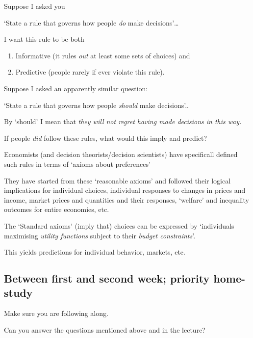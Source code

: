\documentclass[]{article}
\begin{document}
\bigskip

Suppose I asked you

`State a rule that governs how people \emph{do} make decisions'\ldots{}

I want this rule to be both

\begin{enumerate}
\def\labelenumi{\arabic{enumi}.}
\item
  Informative (it rules \emph{out} at least some sets of choices) and
\item
  Predictive (people rarely if ever violate this rule).
\end{enumerate}

\bigskip

Suppose I asked an apparently similar question:

`State a rule that governs how people \emph{should} make decisions'..

By `should' I mean that \emph{they will not regret having made decisions in this way.}

\bigskip

If people \emph{did} follow these rules, what would this imply and predict?

Economists (and decision theorists/decision scientists) have specificall defined such rules in terms of `axioms about preferences'

They have started from these `reasonable axioms' and followed their logical implications for individual choices, individual responses to changes in prices and income, market prices and quantities and their responses, `welfare' and inequality outcomes for entire economies, etc.

The `Standard axioms' (imply that) choices can be expressed by `individuals maximising \emph{utility functions} subject to their \emph{budget constraints}'.

This yields predictions for individual behavior, markets, etc.

\hypertarget{between-first-and-second-week-priority-home-study}{%
\subsection{Between first and second week; priority home-study}\label{between-first-and-second-week-priority-home-study}}

Make sure you are following along.

Can you answer the questions mentioned above and in the lecture?
\end{document}
